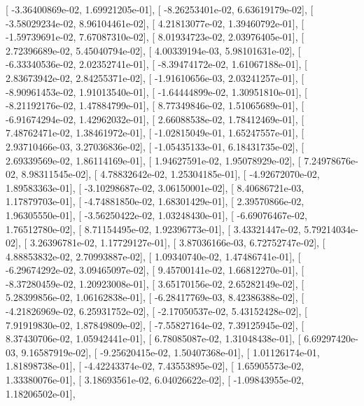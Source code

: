 \documentclass{article}
\begin{document}
       [ -3.36400869e-02,   1.69921205e-01],
       [ -8.26253401e-02,   6.63619179e-02],
       [ -3.58029234e-02,   8.96104461e-02],
       [  4.21813077e-02,   1.39460792e-01],
       [ -1.59739691e-02,   7.67087310e-02],
       [  8.01934723e-02,   2.03976405e-01],
       [  2.72396689e-02,   5.45040794e-02],
       [  4.00339194e-03,   5.98101631e-02],
       [ -6.33340536e-02,   2.02352741e-01],
       [ -8.39474172e-02,   1.61067188e-01],
       [  2.83673942e-02,   2.84255371e-02],
       [ -1.91610656e-03,   2.03241257e-01],
       [ -8.90961453e-02,   1.91013540e-01],
       [ -1.64444899e-02,   1.30951810e-01],
       [ -8.21192176e-02,   1.47884799e-01],
       [  8.77349846e-02,   1.51065689e-01],
       [ -6.91674294e-02,   1.42962032e-01],
       [  2.66088538e-02,   1.78412469e-01],
       [  7.48762471e-02,   1.38461972e-01],
       [ -1.02815049e-01,   1.65247557e-01],
       [  2.93710466e-03,   3.27036836e-02],
       [ -1.05435133e-01,   6.18431735e-02],
       [  2.69339569e-02,   1.86114169e-01],
       [  1.94627591e-02,   1.95078929e-02],
       [  7.24978676e-02,   8.98311545e-02],
       [  4.78832642e-02,   1.25304185e-01],
       [ -4.92672070e-02,   1.89583363e-01],
       [ -3.10298687e-02,   3.06150001e-02],
       [  8.40686721e-03,   1.17879703e-01],
       [ -4.74881850e-02,   1.68301429e-01],
       [  2.39570866e-02,   1.96305550e-01],
       [ -3.56250422e-02,   1.03248430e-01],
       [ -6.69076467e-02,   1.76512780e-02],
       [  8.71154495e-02,   1.92396773e-01],
       [  3.43321447e-02,   5.79214034e-02],
       [  3.26396781e-02,   1.17729127e-01],
       [  3.87036166e-03,   6.72752747e-02],
       [  4.88853832e-02,   2.70993887e-02],
       [  1.09340740e-02,   1.47486741e-01],
       [ -6.29674292e-02,   3.09465097e-02],
       [  9.45700141e-02,   1.66812270e-01],
       [ -8.37280459e-02,   1.20923008e-01],
       [  3.65170156e-02,   2.65282149e-02],
       [  5.28399856e-02,   1.06162838e-01],
       [ -6.28417769e-03,   8.42386388e-02],
       [ -4.21826969e-02,   6.25931752e-02],
       [ -2.17050537e-02,   5.43152428e-02],
       [  7.91919830e-02,   1.87849809e-02],
       [ -7.55827164e-02,   7.39125945e-02],
       [  8.37430706e-02,   1.05942441e-01],
       [  6.78085087e-02,   1.31048438e-01],
       [  6.69297420e-03,   9.16587919e-02],
       [ -9.25620415e-02,   1.50407368e-01],
       [  1.01126174e-01,   1.81898738e-01],
       [ -4.42243374e-02,   7.43553895e-02],
       [  1.65905573e-02,   1.33380076e-01],
       [  3.18693561e-02,   6.04026622e-02],
       [ -1.09843955e-02,   1.18206502e-01],
\end{document}
